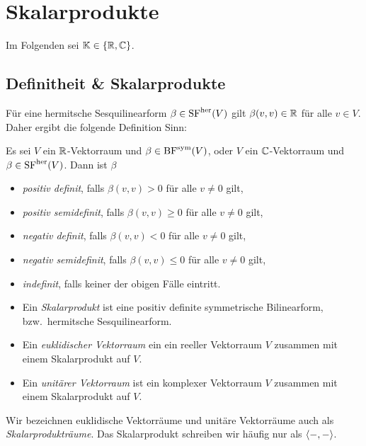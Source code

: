 \chapter{Skalarprodukte}

Im Folgenden sei $\mathbb{K} \in \{ \mathbb{R}, \mathbb{C} \}$.





\section{Definitheit \& Skalarprodukte}

Für eine hermitsche Sesquilinearform $\beta \in \operatorname{SF}^{\operatorname{her}}(V)$ gilt $\beta(v,v) \in \mathbb{R}$ für alle $v \in V$.
Daher ergibt die folgende Definition Sinn:

\begin{definition}
  Es sei $V$ ein $\mathbb{R}$-Vektorraum und $\beta \in \operatorname{BF}^{\operatorname{sym}}(V)$, oder $V$ ein $\mathbb{C}$-Vektorraum und $\beta \in \operatorname{SF}^{\operatorname{her}}(V)$.
  Dann ist $\beta$
  \begin{itemize}
    \item
      \emph{positiv definit}, falls $\beta(v,v) > 0$ für alle $v \neq 0$ gilt,
    \item
      \emph{positiv semidefinit}, falls $\beta(v,v) \geq 0$ für alle $v \neq 0$ gilt,
    \item
      \emph{negativ definit}, falls $\beta(v,v) < 0$ für alle $v \neq 0$ gilt,
    \item
      \emph{negativ semidefinit}, falls $\beta(v,v) \leq 0$ für alle $v \neq 0$ gilt,
    \item
      \emph{indefinit}, falls keiner der obigen Fälle eintritt.
  \end{itemize}
\end{definition}

\begin{definition}
  \begin{itemize}
    \item
      Ein \emph{Skalarprodukt} ist eine positiv definite symmetrische Bilinearform, bzw.\ hermitsche Sesquilinearform.
    \item
      Ein \emph{euklidischer Vektorraum} ein ein reeller Vektorraum $V$ zusammen mit einem Skalarprodukt auf $V$.
    \item
      Ein \emph{unitärer Vektorraum} ist ein komplexer Vektorraum $V$ zusammen mit einem Skalarprodukt auf $V$.
  \end{itemize}
  Wir bezeichnen euklidische Vektorräume und unitäre Vektorräume auch als \emph{Skalarprodukträume}.
  Das Skalarprodukt schreiben wir häufig nur als $\left\langle -, - \right\rangle$.
\end{definition}

